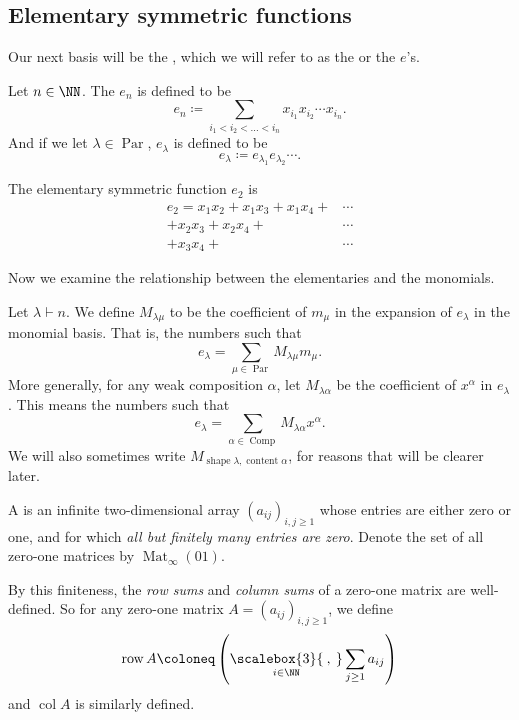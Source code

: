 \documentclass{article}
\newcommand{\bigcomma}{\ensuremath{\mathop{\scalebox{3}{\:,\:}}\limits}}
\DeclareMathOperator{\row}{row}
\DeclareMathOperator{\col}{col}
\DeclareMathOperator{\shape}{shape}
\DeclareMathOperator{\content}{content}
\DeclareMathOperator{\Par}{Par}
\DeclareMathOperator{\Com}{Comp}
\DeclareMathOperator{\Mat}{Mat}
\begin{document}
\subsection{Elementary symmetric functions}

Our next basis will be the , which we will refer to as the  or the $e$'s.

\begin{definition}
    Let $n\in\NN$. 
    The  $e_n$ is defined to be
    \[
        e_n 
        \coloneq 
        \sum_{i_1<i_2<\ldots<i_n} x_{i_1}x_{i_2}\cdots x_{i_n}.
    \]
    And if we let $\lambda \in \Par$, $e_\lambda$ is defined to be
    \[
        e_\lambda 
        \coloneq 
        e_{\lambda_1}e_{\lambda_2}\cdots.
    \]
\end{definition}

\begin{example}
    The elementary symmetric function $e_2$ is
    \begin{align*}
        e_2 = x_1x_2 + x_1x_3 + x_1x_4 + &\cdots \\
        + x_2x_3 + x_2x_4 + &\cdots \\
        + x_3x_4 + &\cdots
    \end{align*}
\end{example}

Now we examine the relationship between the elementaries and the monomials.

\begin{definition}
    Let $\lambda \vdash n$. We define $M_{\lambda\mu}$ to be the coefficient of $m_\mu$ in the expansion of $e_\lambda$ in the monomial basis. That is, the numbers such that
    \[
        e_\lambda = \sum_{\mu \in \Par} M_{\lambda\mu} m_\mu.
    \]
    More generally, for any weak composition $\alpha$, let $M_{\lambda\alpha}$ be the coefficient of $x^\alpha$ in $e_\lambda$.
    This means the numbers such that
    \[
        e_\lambda = \sum_{\alpha \in \Com} M_{\lambda\alpha} x^\alpha.
    \]
    We will also sometimes write $M_{\shape \lambda, \content \alpha}$, for reasons that will be clearer later.
\end{definition}

\begin{definition}
    A  is an infinite two-dimensional array $(a_{ij})_{i,j \geq 1}$ whose entries are either zero or one, and for which \textit{all but finitely many entries are zero}.
    Denote the set of all zero-one matrices by $\Mat_\infty(01)$.

    By this finiteness, the \textit{row sums} and \textit{column sums} of a zero-one matrix are well-defined.
    So for any zero-one matrix $A = (a_{ij})_{i,j \geq 1}$, we define
    \[
        \row A \coloneq \left(\bigcomma_{i \in \NN} \sum_{j \geq 1} a_{ij}\right)
    \]
    and $\col A$ is similarly defined.
\end{definition}
\end{document}
